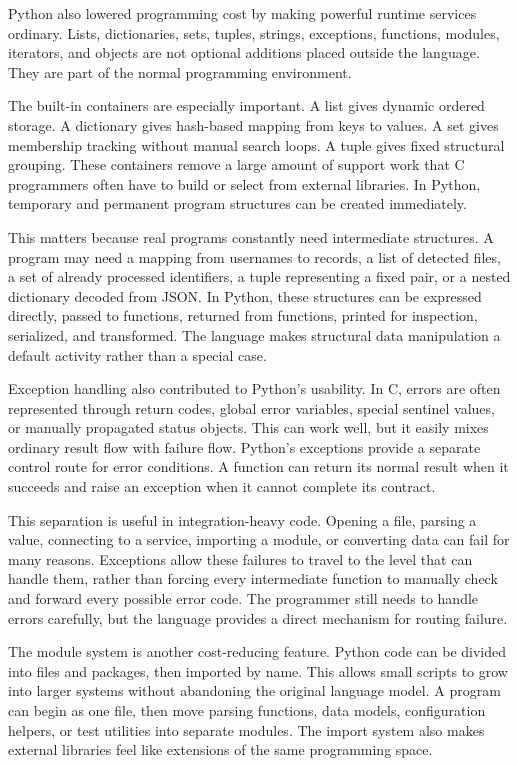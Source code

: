 Python also lowered programming cost by making powerful runtime services ordinary. Lists, dictionaries, sets, tuples, strings, exceptions, functions, modules, iterators, and objects are not optional additions placed outside the language. They are part of the normal programming environment.

The built-in containers are especially important. A list gives dynamic ordered storage. A dictionary gives hash-based mapping from keys to values. A set gives membership tracking without manual search loops. A tuple gives fixed structural grouping. These containers remove a large amount of support work that C programmers often have to build or select from external libraries. In Python, temporary and permanent program structures can be created immediately.

This matters because real programs constantly need intermediate structures. A program may need a mapping from usernames to records, a list of detected files, a set of already processed identifiers, a tuple representing a fixed pair, or a nested dictionary decoded from JSON. In Python, these structures can be expressed directly, passed to functions, returned from functions, printed for inspection, serialized, and transformed. The language makes structural data manipulation a default activity rather than a special case.

Exception handling also contributed to Python's usability. In C, errors are often represented through return codes, global error variables, special sentinel values, or manually propagated status objects. This can work well, but it easily mixes ordinary result flow with failure flow. Python's exceptions provide a separate control route for error conditions. A function can return its normal result when it succeeds and raise an exception when it cannot complete its contract.

This separation is useful in integration-heavy code. Opening a file, parsing a value, connecting to a service, importing a module, or converting data can fail for many reasons. Exceptions allow these failures to travel to the level that can handle them, rather than forcing every intermediate function to manually check and forward every possible error code. The programmer still needs to handle errors carefully, but the language provides a direct mechanism for routing failure.

The module system is another cost-reducing feature. Python code can be divided into files and packages, then imported by name. This allows small scripts to grow into larger systems without abandoning the original language model. A program can begin as one file, then move parsing functions, data models, configuration helpers, or test utilities into separate modules. The import system also makes external libraries feel like extensions of the same programming space.


